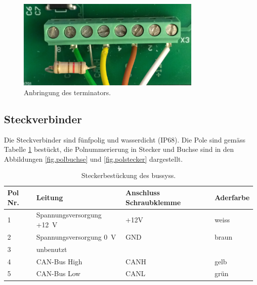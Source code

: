 \begin{figure}
	\centering
		\includegraphics[width=0.8\textwidth]{images/fotos/terminator.png}
	\caption{Anbringung des \gls{terminator}s.}
	\label{fig.terminator}
\end{figure}

\subsection{Steckverbinder}
Die Steckverbinder sind fünfpolig und wasserdicht (IP68). Die Pole sind gemäss Tabelle \ref{table.stecker} bestückt, die Polnummerierung in Stecker und Buchse sind in den Abbildungen \ref{fig.polbuchse} und \ref{fig.polstecker} dargestellt.

\begin{table}
\begin{tabular}{|l|l|l|l|}
\hline \textbf{Pol Nr.}      & \textbf{Leitung} & Anschluss Schraubklemme & Aderfarbe\\ 
\hline 1 & Spannungsversorgung +12~V & +12V & weiss \\
\hline 2 & Spannungsversorgung 0~V & GND & braun \\
\hline 3 & unbenutzt &  &  \\
\hline 4 & CAN-Bus High & CANH & gelb \\
\hline 5 & CAN-Bus Low & CANL & grün \\
\hline 
\end{tabular}
\caption{Steckerbestückung des \gls{bussys}s.}
\label{table.stecker}
\end{table}  

